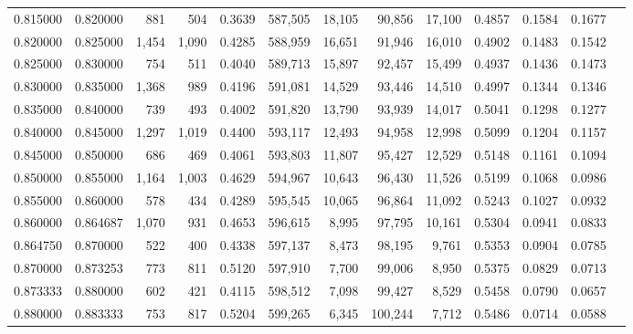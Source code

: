 \begin{tabular}{rrrrrrrrrrrrr}
0.815000 & 0.820000 &    881 &   504 &                                     0.3639 & 587,505 &  18,105 &  90,856 &  17,100 & 0.4857 & 0.1584 & 0.1677 \\
0.820000 & 0.825000 &  1,454 & 1,090 &                                     0.4285 & 588,959 &  16,651 &  91,946 &  16,010 & 0.4902 & 0.1483 & 0.1542 \\
0.825000 & 0.830000 &    754 &   511 &                                     0.4040 & 589,713 &  15,897 &  92,457 &  15,499 & 0.4937 & 0.1436 & 0.1473 \\
0.830000 & 0.835000 &  1,368 &   989 &                                     0.4196 & 591,081 &  14,529 &  93,446 &  14,510 & 0.4997 & 0.1344 & 0.1346 \\
0.835000 & 0.840000 &    739 &   493 &                                     0.4002 & 591,820 &  13,790 &  93,939 &  14,017 & 0.5041 & 0.1298 & 0.1277 \\
0.840000 & 0.845000 &  1,297 & 1,019 &                                     0.4400 & 593,117 &  12,493 &  94,958 &  12,998 & 0.5099 & 0.1204 & 0.1157 \\
0.845000 & 0.850000 &    686 &   469 &                                     0.4061 & 593,803 &  11,807 &  95,427 &  12,529 & 0.5148 & 0.1161 & 0.1094 \\
0.850000 & 0.855000 &  1,164 & 1,003 &                                     0.4629 & 594,967 &  10,643 &  96,430 &  11,526 & 0.5199 & 0.1068 & 0.0986 \\
0.855000 & 0.860000 &    578 &   434 &                                     0.4289 & 595,545 &  10,065 &  96,864 &  11,092 & 0.5243 & 0.1027 & 0.0932 \\
0.860000 & 0.864687 &  1,070 &   931 &                                     0.4653 & 596,615 &   8,995 &  97,795 &  10,161 & 0.5304 & 0.0941 & 0.0833 \\
0.864750 & 0.870000 &    522 &   400 &                                     0.4338 & 597,137 &   8,473 &  98,195 &   9,761 & 0.5353 & 0.0904 & 0.0785 \\
0.870000 & 0.873253 &    773 &   811 &                                     0.5120 & 597,910 &   7,700 &  99,006 &   8,950 & 0.5375 & 0.0829 & 0.0713 \\
0.873333 & 0.880000 &    602 &   421 &                                     0.4115 & 598,512 &   7,098 &  99,427 &   8,529 & 0.5458 & 0.0790 & 0.0657 \\
0.880000 & 0.883333 &    753 &   817 &                                     0.5204 & 599,265 &   6,345 & 100,244 &   7,712 & 0.5486 & 0.0714 & 0.0588 \\

\end{tabular}
